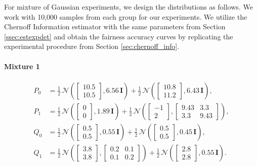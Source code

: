 \documentclass[11pt,letterpaper]{article}
\begin{document}
For mixture of Gaussian experiments, we design the distributions as follows. We work with 10,000 samples from each group for our experiments. We utilize the Chernoff Information estimator with the same parameters from Section \ref{ssec:estexpdet} and obtain the fairness accuracy curves by replicating the experimental procedure from Section \ref{sec:chernoff_info}.

\paragraph{Mixture 1}

\begin{align}
P_0 &= \tfrac{1}{2}\,\mathcal{N}\!\left(
  \begin{bmatrix}10.5 \\ 10.5\end{bmatrix},
  6.56\,\textbf{I}
\right)
+ \tfrac{1}{2}\,\mathcal{N}\!\left(
  \begin{bmatrix}10.8 \\ 11.2\end{bmatrix},
  6.43\,\textbf{I}
\right), \\[6pt]
P_1 &= \tfrac{1}{2}\,\mathcal{N}\!\left(
  \begin{bmatrix}0 \\ 0\end{bmatrix},
  1.89\,\textbf{I}
\right)
+ \tfrac{1}{2}\,\mathcal{N}\!\left(
  \begin{bmatrix}-1 \\ 2\end{bmatrix},
  \begin{bmatrix}9.43 & 3.3 \\ 3.3 & 9.43\end{bmatrix}
\right), \\[6pt]
Q_0 &= \tfrac{1}{2}\,\mathcal{N}\!\left(
  \begin{bmatrix}0.5 \\ 0.5\end{bmatrix},
  0.55\,\textbf{I}
\right)
+ \tfrac{1}{2}\,\mathcal{N}\!\left(
  \begin{bmatrix}0.5 \\ 0.5\end{bmatrix},
  0.45\,\textbf{I}
\right), \\[6pt]
Q_1 &= \tfrac{1}{2}\,\mathcal{N}\!\left(
  \begin{bmatrix}3.8 \\ 3.8\end{bmatrix},
  \begin{bmatrix}0.2 & 0.1 \\ 0.1 & 0.2\end{bmatrix}
\right)
+ \tfrac{1}{2}\,\mathcal{N}\!\left(
  \begin{bmatrix}2.8 \\ 2.8\end{bmatrix},
  0.55\,\textbf{I}
\right).
\end{align}
\end{document}
